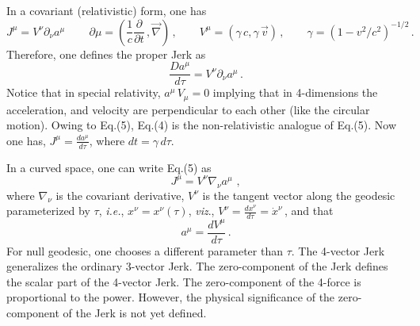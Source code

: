 \documentclass[12pt]{article}
\begin{document}
In a covariant (relativistic) form, one has
\begin{equation}
J^{\mu}=V^\nu\partial_\nu  a^\mu\,\qquad \partial\mu=\left(\frac{1}{c}\frac{\partial}{\partial t}\,,\vec{\nabla}\right)\,,\qquad V^\mu=(\gamma\, c, \gamma\, \vec{v})\,,\qquad \gamma=(1-v^2/c^2)^{-1/2}\,.
\end{equation}
Therefore, one defines the proper Jerk as
\begin{equation}
\frac{Da^\mu}{d\tau}=V^\nu\partial_\nu a^\mu\,.
\end{equation}
Notice that in special relativity, $a^\mu\,V_\mu=0$ implying that in 4-dimensions the acceleration, and velocity are perpendicular to each other (like the circular motion).
Owing to Eq.(5), Eq.(4) is the non-relativistic analogue of Eq.(5). Now one has, $J^\mu=\frac{da^\mu}{d\tau}$, where $dt=\gamma\, d\tau$.

In a curved space, one can write Eq.(5) as
\begin{equation}
J^{\mu}=V^\nu\nabla_\nu  a^\mu\, \,,
\end{equation}
where $\nabla_\nu$ is the covariant derivative, $V^\nu$ is the tangent vector along the geodesic parameterized by $\tau$, \emph{i.e.}, $x^\nu=x^\nu(\tau)$, \emph{viz}., $V^\nu=\frac{dx^\nu}{d\tau}=\dot x^\nu$\,, and that
\begin{equation}
a^\mu=\frac{dV^\mu}{d\tau}\,.
\end{equation}
For null geodesic, one chooses a different parameter than $\tau$. The 4-vector Jerk generalizes the ordinary 3-vector Jerk. The zero-component of the Jerk defines the scalar part of the 4-vector Jerk.  The zero-component of the 4-force  is proportional to the power. However, the physical significance of the zero-component of the Jerk is not yet defined.
\end{document}
